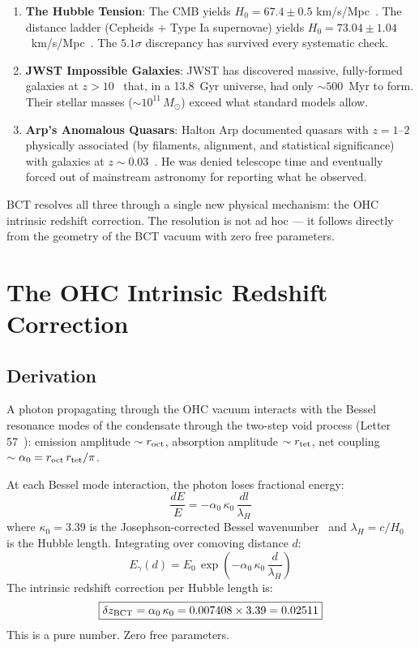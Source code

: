 \documentclass[twocolumn,10pt]{article}
\begin{document}
\begin{enumerate}
\item \textbf{The Hubble Tension}: The CMB yields $H_0 = 67.4 \pm 0.5$
  km/s/Mpc~\cite{planck2018}. The distance ladder (Cepheids + Type Ia
  supernovae) yields $H_0 = 73.04 \pm 1.04$~km/s/Mpc~\cite{riess2022}.
  The $5.1\sigma$ discrepancy has survived every systematic check.
  
\item \textbf{JWST Impossible Galaxies}: JWST has discovered massive,
  fully-formed galaxies at $z > 10$~\cite{labbe2023} that, in a
  13.8~Gyr universe, had only $\sim 500$~Myr to form. Their stellar
  masses ($\sim 10^{11}\,M_\odot$) exceed what standard models allow.

\item \textbf{Arp's Anomalous Quasars}: Halton Arp documented
  quasars with $z = 1$--$2$ physically associated (by filaments,
  alignment, and statistical significance) with galaxies at
  $z \sim 0.03$~\cite{arp1987}. He was denied telescope time and
  eventually forced out of mainstream astronomy for reporting
  what he observed.
\end{enumerate}

BCT resolves all three through a single new physical mechanism:
the OHC intrinsic redshift correction. The resolution is not
ad hoc --- it follows directly from the geometry of the BCT
vacuum with zero free parameters.

\section{The OHC Intrinsic Redshift Correction}

\subsection{Derivation}

A photon propagating through the OHC vacuum interacts with the
Bessel resonance modes of the condensate through the two-step
void process (Letter 57~\cite{bct_l57}): emission amplitude
$\sim r_{\rm oct}$, absorption amplitude $\sim r_{\rm tet}$,
net coupling $\sim \alpha_0 = r_{\rm oct}\,r_{\rm tet}/\pi$.

At each Bessel mode interaction, the photon loses fractional
energy:
%
\begin{equation}
\frac{dE}{E} = -\alpha_0\,\kappa_0\,\frac{dl}{\lambda_H}
\end{equation}
%
where $\kappa_0 = 3.39$ is the Josephson-corrected Bessel
wavenumber~\cite{bct_jhapp} and $\lambda_H = c/H_0$ is the
Hubble length. Integrating over comoving distance $d$:
%
\begin{equation}
E_\gamma(d) = E_0\,\exp\!\left(-\alpha_0\,\kappa_0\,\frac{d}{\lambda_H}\right)
\end{equation}
%
The intrinsic redshift correction per Hubble length is:
%
\begin{equation}
\boxed{\delta z_{\rm BCT} = \alpha_0\,\kappa_0 
= 0.007408 \times 3.39 = 0.02511}
\label{eq:dz}
\end{equation}
%
This is a pure number. Zero free parameters.
\end{document}

